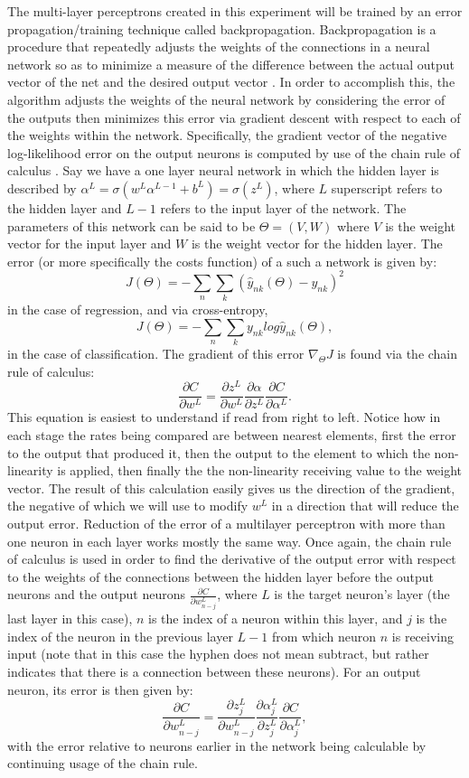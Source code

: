 The multi-layer perceptrons created in this experiment will be trained
by an error propagation/training technique called backpropagation.
Backpropagation is a procedure that repeatedly adjusts the weights of the
connections in a neural network so as to minimize a measure of the difference
between the actual output vector of the net and the desired output
vector \cite{Rumelhart}. In order to accomplish this, the algorithm
adjusts the weights of the neural network by considering the error of
the outputs then minimizes this error via gradient descent with respect
to each of the weights within the network. Specifically, the gradient
vector of the negative log-likelihood error on the output neurons is
computed by use of the chain rule of calculus \cite{Murphy}. Say we
have a one layer neural network in which the hidden layer is described
by $\alpha^{L} = \sigma(w^{L}\alpha^{L-1} + b^{L}) = \sigma(z^{L})$,
where $L$ superscript refers to the hidden layer and $L-1$ refers
to the input layer of the network. The parameters of this network can
be said to be $\Theta = (V,W)$ where $V$ is the weight vector for the input
layer and $W$ is the weight vector for the hidden layer. The error (or
more specifically the costs function) of a such a network is given by:
$$J(\Theta ) = - \sum_n\sum_k(\hat{y}_{nk}(\Theta)-y_{nk})^2$$
in the case of regression, and via cross-entropy,
$$J(\Theta ) = - \sum_n\sum_ky_{nk}log\hat{y}_{nk}(\Theta),$$
in the case of classification. The gradient of this error $\nabla_{\Theta}J$
is found via the chain rule of calculus:
$$\frac{\partial C}{\partial
w^{L}} = \frac{\partial z^{L}}{\partial
w^{L}}\frac{\partial \alpha}{\partial z^{L}}\frac{\partial
  C}{\partial \alpha^{L}}.$$
This equation is easiest to understand if read from right to left.
Notice how in each stage the rates being compared are between nearest
elements, first the error to the output that produced it, then the output
to the element to which the non-linearity is applied, then finally the the
non-linearity receiving value to the weight vector. The result of this
calculation easily gives us the direction of the gradient, the negative of
which we will use to modify $w^{L}$ in a direction that will reduce the output
error. Reduction of the error of a multilayer perceptron with more
than one neuron in each layer works mostly the same way. Once again,
the chain rule of calculus is used in order to find the derivative of
the output error with respect to the weights of the connections
between the hidden layer before the output neurons and the output
neurons $\frac{\partial C}{\partial w^{L}_{n-j}}$, where $L$ is the
target neuron's layer (the last layer in this case), $n$ is the index of
a neuron within this layer, and $j$ is the index of the neuron in the
previous layer $L-1$ from which neuron $n$ is receiving input (note
that in this case the hyphen does not mean subtract, but rather
indicates that there is a connection between these neurons). For an output
neuron, its error is then given by:
$$\frac{\partial C}{\partial w^{L}_{n-j}} = \frac{\partial z^{L}_{j}}{\partial w^{L}_{n-j}}\frac{\partial \alpha^{L}_{j}}{\partial z^{L}_{j}}\frac{\partial C}{\partial \alpha^{L}_{j}},$$
with the error relative to neurons earlier in the network being calculable by
continuing usage of the chain rule.

